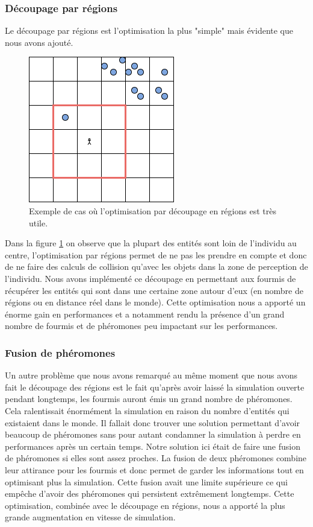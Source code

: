 \documentclass{EPUProjetDi}
\begin{document}
\subsubsection{Découpage par régions}

Le découpage par régions est l'optimisation la plus "simple" mais évidente que nous avons ajouté.

\begin{figure}[h]
    \centering
    \includegraphics[scale=1]{decoupage_region.png}
    \caption{Exemple de cas où l'optimisation par découpage en régions est très utile.}
    \label{fig:decoupage_region}
\end{figure}

Dans la figure \ref{fig:decoupage_region} on observe que la plupart des entités sont loin de l'individu au centre, l'optimisation par régions permet de ne pas les prendre en compte et donc de ne faire des calculs
de collision qu'avec les objets dans la zone de perception de l'individu.
Nous avons implémenté ce découpage en permettant aux fourmis de récupérer les entités qui sont dans une certaine zone autour d'eux (en nombre de régions ou en distance réel dans le monde).
Cette optimisation nous a apporté un énorme gain en performances et a notamment rendu la présence d'un grand nombre de fourmis et de phéromones peu impactant sur les performances.


\pagebreak

\subsubsection{Fusion de phéromones}
Un autre problème que nous avons remarqué au même moment que nous avons fait le découpage des régions est le fait qu'après avoir laissé la simulation ouverte pendant longtemps, les fourmis
auront émis un grand nombre de phéromones. Cela ralentissait énormément la simulation en raison du nombre d'entités qui existaient dans le monde. Il fallait donc trouver une solution permettant
d'avoir beaucoup de phéromones sans pour autant condamner la simulation à perdre en performances après un certain temps.
Notre solution ici était de faire une fusion de phéromones si elles sont assez proches. La fusion de deux phéromones combine leur attirance pour les fourmis et donc permet de garder les informations
tout en optimisant plus la simulation. Cette fusion avait une limite supérieure ce qui empêche d'avoir des phéromones qui persistent extrêmement longtemps.
Cette optimisation, combinée avec le découpage en régions, nous a apporté la plus grande augmentation en vitesse de simulation.
\end{document}
